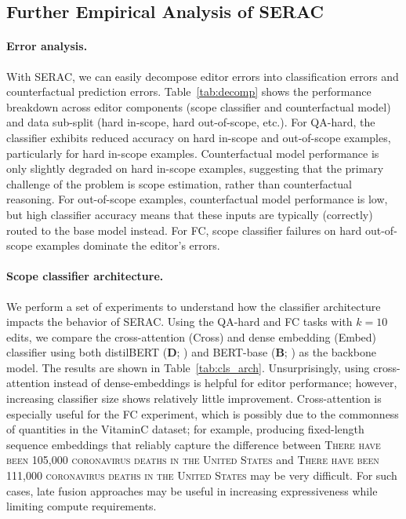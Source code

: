 \documentclass{article}
\newcommand{\name}{SERAC}
\newcommand{\rawstring}[1]{\textsc{\footnotesize #1}}
\begin{document}
\subsection{Further Empirical Analysis of {\name}}
\paragraph{Error analysis.}
With {\name}, we can easily decompose editor errors into classification errors and counterfactual prediction errors. Table~\ref{tab:decomp} shows the performance breakdown across editor components (scope classifier and counterfactual model) and data sub-split (hard in-scope, hard out-of-scope, etc.). For QA-hard, the classifier exhibits reduced accuracy on hard in-scope and out-of-scope examples, particularly for hard in-scope examples. Counterfactual model performance is only slightly degraded on hard in-scope examples, suggesting that the primary challenge of the problem is scope estimation, rather than counterfactual reasoning. For out-of-scope examples, counterfactual model performance is low, but high classifier accuracy means that these inputs are typically (correctly) routed to the base model instead. For FC, scope classifier failures on hard out-of-scope examples dominate the editor's errors.

\paragraph{Scope classifier architecture.}
\label{sec:cls_arch}
We perform a set of experiments to understand how the classifier architecture impacts the behavior of {\name}. Using the QA-hard and FC tasks with $k=10$ edits, we compare the cross-attention (Cross) and dense embedding (Embed) classifier using both distilBERT (\textbf{D}; \citep{Sanh2019DistilBERTAD}) and BERT-base (\textbf{B}; \citep{devlin2019bert}) as the backbone model. The results are shown in Table~\ref{tab:cls_arch}. Unsurprisingly, using cross-attention instead of dense-embeddings is helpful for editor performance; however, increasing classifier size shows relatively little improvement. Cross-attention is especially useful for the FC experiment, which is possibly due to the commonness of quantities in the VitaminC dataset; for example, producing fixed-length sequence embeddings that reliably capture the difference between \rawstring{There have been 105,000 coronavirus deaths in the United States} and \rawstring{There have been 111,000 coronavirus deaths in the United States} may be very difficult. For such cases, late fusion approaches \citep{khattab2020colbert} may be useful in increasing expressiveness while limiting compute requirements.
\end{document}
